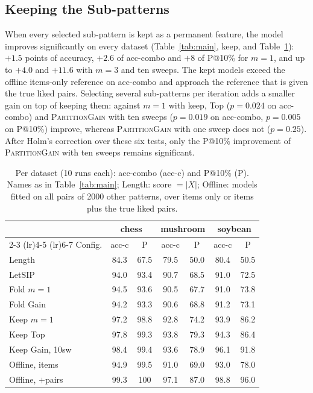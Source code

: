 \subsection{Keeping the Sub-patterns}
\label{subsec:keep_results}

When every selected sub-pattern is kept as a permanent feature, the model improves significantly on every
dataset (Table~\ref{tab:main}, keep, and Table~\ref{tab:keep_datasets}): $+1.5$ points of accuracy, $+2.6$
of acc-combo and $+8$ of P@10\% for $m = 1$, and up to $+4.0$ and $+11.6$ with $m = 3$ and
ten sweeps. The kept models exceed the offline items-only reference on acc-combo and approach the reference
that is given the true liked pairs. Selecting several sub-patterns per iteration adds a smaller gain on top
of keeping them: against $m = 1$ with keep, Top ($p = 0.024$ on acc-combo) and
\textsc{PartitionGain} with ten sweeps ($p = 0.019$ on acc-combo, $p = 0.005$ on P@10\%) improve, whereas
\textsc{PartitionGain} with one sweep does not ($p = 0.25$). After Holm's correction over these six tests,
only the P@10\% improvement of \textsc{PartitionGain} with ten sweeps remains significant.

\begin{table}[t]
\centering
\caption{Per dataset (10 runs each): acc-combo (acc-c) and P@10\% (P). Names as in
Table~\ref{tab:main}; Length: score $= |X|$; Offline: models fitted on all pairs of 2000 other patterns,
over items only or items plus the true liked pairs.}
\label{tab:keep_datasets}
\small
\setlength{\tabcolsep}{3.5pt}
\begin{tabular}{lcccccc}
\toprule
& \multicolumn{2}{c}{chess} & \multicolumn{2}{c}{mushroom} & \multicolumn{2}{c}{soybean} \\
\cmidrule(lr){2-3} \cmidrule(lr){4-5} \cmidrule(lr){6-7}
Config. & acc-c & P & acc-c & P & acc-c & P \\
\midrule
Length              & 84.3 & 67.5 & 79.5 & 50.0 & 80.4 & 50.5 \\
LetSIP              & 94.0 & 93.4 & 90.7 & 68.5 & 91.0 & 72.5 \\
Fold $m{=}1$        & 94.5 & 93.6 & 90.5 & 67.7 & 91.0 & 73.8 \\
Fold Gain           & 94.2 & 93.3 & 90.6 & 68.8 & 91.2 & 73.1 \\
Keep $m{=}1$        & 97.2 & 98.8 & 92.8 & 74.2 & 93.9 & 86.2 \\
Keep Top            & 97.8 & 99.3 & 93.8 & 79.3 & 94.3 & 86.4 \\
Keep Gain, 10sw     & 98.4 & 99.4 & 93.6 & 78.9 & 96.1 & 91.8 \\
\midrule
Offline, items      & 94.9 & 99.5 & 91.0 & 69.0 & 93.0 & 78.0 \\
Offline, $+$pairs   & 99.3 & 100  & 97.1 & 87.0 & 98.8 & 96.0 \\
\bottomrule
\end{tabular}
\end{table}

